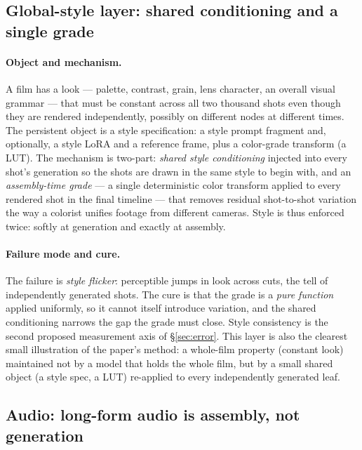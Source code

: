 \documentclass[11pt]{article}
\begin{document}
\subsection{Global-style layer: shared conditioning and a single grade}
\label{sec:style}

\paragraph{Object and mechanism.} A film has a look --- palette, contrast, grain, lens character, an overall
visual grammar --- that must be constant across all two thousand shots even though they are rendered
independently, possibly on different nodes at different times. The persistent object is a style specification: a
style prompt fragment and, optionally, a style LoRA and a reference frame, plus a color-grade transform (a LUT).
The mechanism is two-part: \emph{shared style conditioning} injected into every shot's generation so the shots
are drawn in the same style to begin with, and an \emph{assembly-time grade} --- a single deterministic color
transform applied to every rendered shot in the final timeline --- that removes residual shot-to-shot variation
the way a colorist unifies footage from different cameras. Style is thus enforced twice: softly at generation and
exactly at assembly.

\paragraph{Failure mode and cure.} The failure is \emph{style flicker}: perceptible jumps in look across cuts,
the tell of independently generated shots. The cure is that the grade is a \emph{pure function} applied
uniformly, so it cannot itself introduce variation, and the shared conditioning narrows the gap the grade must
close. Style consistency is the second proposed measurement axis of \S\ref{sec:error}. This layer is also the
clearest small illustration of the paper's method: a whole-film property (constant look) maintained not by a
model that holds the whole film, but by a small shared object (a style spec, a LUT) re-applied to every
independently generated leaf.

\subsection{Audio: long-form audio is assembly, not generation}
\label{sec:audio}
\end{document}
